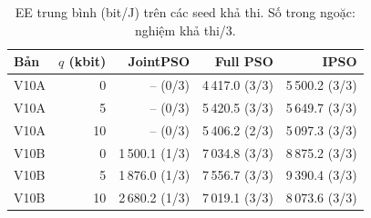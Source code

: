 \begin{table}
\centering
\renewcommand{\arraystretch}{1.16}
\setlength{\tabcolsep}{5pt}
\begin{tabular}{lrrrr}
\toprule
Bản & $q$ (kbit) & JointPSO & Full PSO & IPSO \\
\midrule
V10A & 0 & -- (0/3) & 4\,417.0 (3/3) & 5\,500.2 (3/3) \\
V10A & 5 & -- (0/3) & 5\,420.5 (3/3) & 5\,649.7 (3/3) \\
V10A & 10 & -- (0/3) & 5\,406.2 (2/3) & 5\,097.3 (3/3) \\
V10B & 0 & 1\,500.1 (1/3) & 7\,034.8 (3/3) & 8\,875.2 (3/3) \\
V10B & 5 & 1\,876.0 (1/3) & 7\,556.7 (3/3) & 9\,390.4 (3/3) \\
V10B & 10 & 2\,680.2 (1/3) & 7\,019.1 (3/3) & 8\,073.6 (3/3) \\
\bottomrule
\end{tabular}
\caption{EE trung bình (bit/J) trên các seed khả thi. Số trong ngoặc: nghiệm khả thi/3.}
\end{table}
